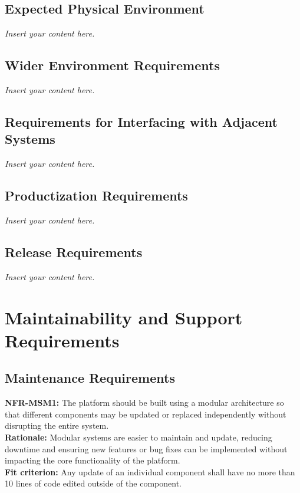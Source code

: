 \documentclass[12pt]{article}
\newcommand{\lips}{\textit{Insert your content here.}}
\begin{document}
\subsection{Expected Physical Environment}
\lips
\subsection{Wider Environment Requirements}
\lips
\subsection{Requirements for Interfacing with Adjacent Systems}
\lips
\subsection{Productization Requirements}
\lips
\subsection{Release Requirements}
\lips

\section{Maintainability and Support Requirements}
\subsection{Maintenance Requirements}
\textbf{NFR-MSM1: }The platform should be built using a modular architecture so that different components may be updated or replaced independently without disrupting the entire system.\\
\textbf{Rationale: }Modular systems are easier to maintain and update, reducing downtime and ensuring new features or bug fixes can be implemented without impacting the core functionality of the platform.\\
\textbf{Fit criterion: }Any update of an individual component shall have no more than 10 lines of code edited outside of the component.\\\\
\end{document}
